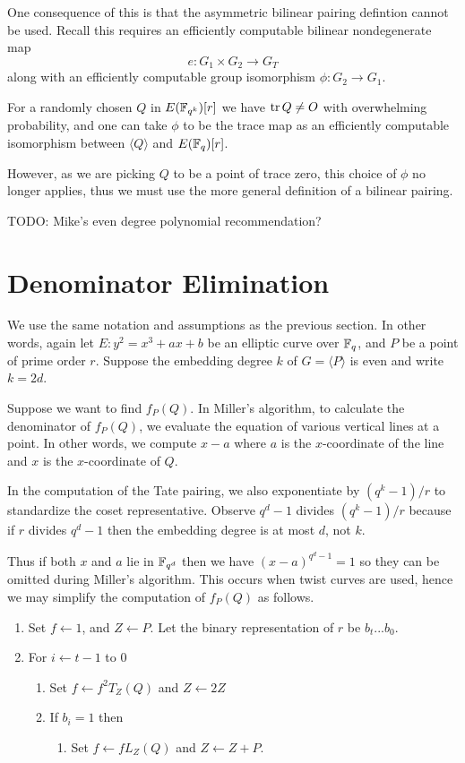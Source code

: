 One consequence of this is that the asymmetric bilinear pairing defintion
cannot be used. Recall this requires an efficiently
computable bilinear nondegenerate map
\[
e:G_1 \times G_2 \rightarrow G_T
\]
along with an efficiently computable group isomorphism
$\phi : G_2 \rightarrow G_1$.

For a randomly chosen $Q$ in $E(\mathbb{F}_{q^k})[r]$ we have $\mathop{\rm tr} Q \ne O$ with
overwhelming probability, and one can take $\phi$ to be the trace map
as an efficiently computable isomorphism between $\langle Q \rangle$
and $E(\mathbb{F}_q)[r]$.

However, as we are picking $Q$ to be a point of trace zero, this choice
of $\phi$ no longer applies, thus we must use the more general definition
of a bilinear pairing.

TODO: Mike's even degree polynomial recommendation?

\section {Denominator Elimination}

We use the same notation and assumptions as the previous section.
In other words, again let $E : y^2 = x^3 + a x + b$ be an elliptic curve
over $\mathbb{F}_q$,
and $P$ be a point of prime order $r$.
Suppose the embedding degree $k$ of $G = \langle P \rangle$ is even
and write $k = 2d$.

Suppose we want to find $f_P(Q)$.
In Miller's algorithm, to calculate the denominator of
$f_P(Q)$, we evaluate the equation of various vertical lines
at a point. In other words, we compute $x - a$ where $a$ is the
$x$-coordinate of the line and $x$ is the $x$-coordinate of $Q$.

In the computation of the Tate pairing, we also exponentiate by
$(q^k - 1)/r$ to standardize the coset representative. Observe
$q^d - 1$ divides $(q^k-1)/r$ because if $r$ divides $q^d - 1$ then
the embedding degree is at most $d$, not $k$.

Thus if both $x$ and $a$ lie in $\mathbb{F}_{q^d}$ then we have
$(x-a)^{q^d - 1} = 1$ so they can be omitted during Miller's algorithm.
This occurs when twist curves are used, hence we may simplify
the computation of $f_P(Q)$ as follows.

\begin{enumerate}
\item
Set $f \leftarrow 1$, and $Z \leftarrow P$.
Let the binary representation of $r$ be $b_t ... b_0$.
\item
For $i \leftarrow t-1$ to $0$
    \begin{enumerate}
    \item
    Set $f \leftarrow f^2 T_Z(Q)$ and $Z \leftarrow 2Z$
    \item
    If $b_i = 1$ then
	\begin{enumerate}
	\item
	Set $f \leftarrow f L_Z(Q)$ and $Z \leftarrow Z + P$.
	\end{enumerate}
    \end{enumerate}
\end{enumerate}

